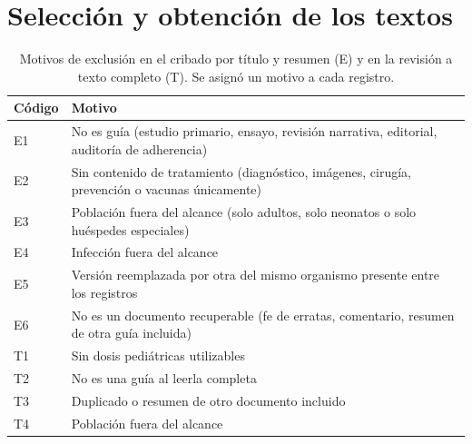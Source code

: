 \documentclass[10pt,a4paper]{article}
\begin{document}
\section{Selección y obtención de los textos}

\begin{table}[htbp]
\centering
\caption{Motivos de exclusión en el cribado por título y resumen (E) y en la revisión a texto completo (T). Se asignó un motivo a cada registro.}
\small
\begin{tabularx}{\textwidth}{@{}lX@{}}
\toprule
Código & Motivo \\
\midrule
E1 & No es guía (estudio primario, ensayo, revisión narrativa, editorial, auditoría de adherencia) \\
E2 & Sin contenido de tratamiento (diagnóstico, imágenes, cirugía, prevención o vacunas únicamente) \\
E3 & Población fuera del alcance (solo adultos, solo neonatos o solo huéspedes especiales) \\
E4 & Infección fuera del alcance \\
E5 & Versión reemplazada por otra del mismo organismo presente entre los registros \\
E6 & No es un documento recuperable (fe de erratas, comentario, resumen de otra guía incluida) \\
\midrule
T1 & Sin dosis pediátricas utilizables \\
T2 & No es una guía al leerla completa \\
T3 & Duplicado o resumen de otro documento incluido \\
T4 & Población fuera del alcance \\
\bottomrule
\end{tabularx}
\end{table}
\end{document}

